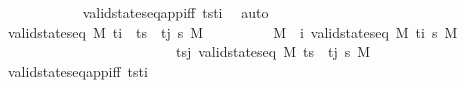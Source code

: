 \begin{isabellebody}
\ \ \ \ \ \ \ \ \isamarkupfalse%
\ {}\ {}\ valid{\isacharunderscore}{\kern0pt}state{\isacharunderscore}{\kern0pt}seq{\isacharunderscore}{\kern0pt}app{\isacharunderscore}{\kern0pt}iff{\isacharbrackleft}{\kern0pt}\ tst\isactrlsub i{\isacharprime}{\kern0pt}{\isacharbrackright}{\kern0pt}{\isachardoublequoteclose}{\isacharbrackright}{\kern0pt}\ \isamarkupfalse%
\ auto\ \ \ \ \ \ \ \ \ \ \ \ \ \ \isanewline
\ \ \ \ \isamarkupfalse%
\isanewline
\ \ \ \ \ \ \isamarkupfalse%
\ {\isachardoublequoteopen}valid{\isacharunderscore}{\kern0pt}state{\isacharunderscore}{\kern0pt}seq\ M\ {\isacharparenleft}{\kern0pt}{\isacharparenleft}{\kern0pt}t\isactrlsub i{\isacharprime}{\kern0pt}\ {\isacharhash}{\kern0pt}\ ts\ {\isacharat}{\kern0pt}\ {\isacharbrackleft}{\kern0pt}t\isactrlsub j{\isacharbrackright}{\kern0pt}{\isacharparenright}{\kern0pt}\ {\isasympi}s\ M{\isacharprime}{\kern0pt}{\isachardoublequoteclose}\isanewline
\ \ \ \ \ \ \isamarkupfalse%
\ \isamarkupfalse%
\ M{\isacharprime}{\kern0pt}{\isacharprime}{\kern0pt}\ \ i{\isacharprime}{\kern0pt}{\isacharcolon}{\kern0pt}\ {\isachardoublequoteopen}valid{\isacharunderscore}{\kern0pt}state{\isacharunderscore}{\kern0pt}seq\ M\ {\isacharbrackleft}{\kern0pt}t\isactrlsub i{\isacharprime}{\kern0pt}{\isacharbrackright}{\kern0pt}\ {\isasympi}s\ M{\isacharprime}{\kern0pt}{\isacharprime}{\kern0pt}{\isachardoublequoteclose}\ \isanewline
\ \ \ \ \ \ \ \ \ \ \ \ \ \ \ \ \ \ \ \ \ \ \ \ \ tsj{\isacharcolon}{\kern0pt}\ {\isachardoublequoteopen}valid{\isacharunderscore}{\kern0pt}state{\isacharunderscore}{\kern0pt}seq\ M{\isacharprime}{\kern0pt}{\isacharprime}{\kern0pt}\ {\isacharparenleft}{\kern0pt}ts\ {\isacharat}{\kern0pt}\ {\isacharbrackleft}{\kern0pt}t\isactrlsub j{\isacharbrackright}{\kern0pt}{\isacharparenright}{\kern0pt}\ {\isasympi}s\ M{\isacharprime}{\kern0pt}{\isachardoublequoteclose}\isanewline
\ \ \ \ \ \ \ \ \isamarkupfalse%
\ valid{\isacharunderscore}{\kern0pt}state{\isacharunderscore}{\kern0pt}seq{\isacharunderscore}{\kern0pt}app{\isacharunderscore}{\kern0pt}iff{\isacharbrackleft}{\kern0pt}\ tst\isactrlsub i{\isacharprime}{\kern0pt}{\isacharbrackright}{\kern0pt}{\isachardoublequoteclose}{\isacharbrackright}{\kern0pt}\ \isamarkupfalse%

\end{isabellebody}
